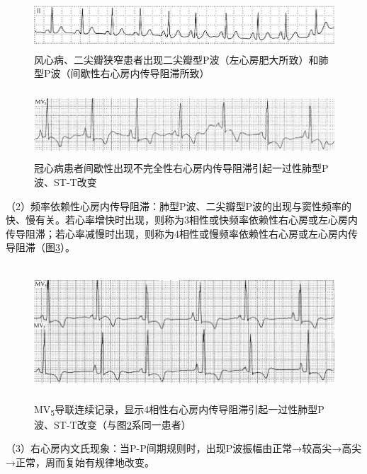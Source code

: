 \begin{figure}[!htbp]
 \centering
 \includegraphics[width=5.82292in,height=0.72917in]{./images/Image00012.jpg}
 \captionsetup{justification=centering}
 \caption{风心病、二尖瓣狭窄患者出现二尖瓣型P波（左心房肥大所致）和肺型P波（间歇性右心房内传导阻滞所致）}
 \label{fig1-7}
  \end{figure} 

\begin{figure}[!htbp]
 \centering
 \includegraphics[width=5.78125in,height=1in]{./images/Image00013.jpg}
 \captionsetup{justification=centering}
 \caption{冠心病患者间歇性出现不完全性右心房内传导阻滞引起一过性肺型P波、ST-T改变}
 \label{fig1-8}
  \end{figure} 

（2）频率依赖性心房内传导阻滞：肺型P波、二尖瓣型P波的出现与窦性频率的快、慢有关。若心率增快时出现，则称为3相性或快频率依赖性右心房或左心房内传导阻滞；若心率减慢时出现，则称为4相性或慢频率依赖性右心房或左心房内传导阻滞（图\ref{fig1-9}）。

\begin{figure}[!htbp]
 \centering
 \includegraphics[width=5.78125in,height=1.97917in]{./images/Image00014.jpg}
 \captionsetup{justification=centering}
 \caption{MV\textsubscript{5}导联连续记录，显示4相性右心房内传导阻滞引起一过性肺型P波、ST-T改变（与图\ref{fig1-8}系同一患者）}
 \label{fig1-9}
  \end{figure} 


（3）右心房内文氏现象：当P-P间期规则时，出现P波振幅由正常→较高尖→高尖→正常，周而复始有规律地改变。

